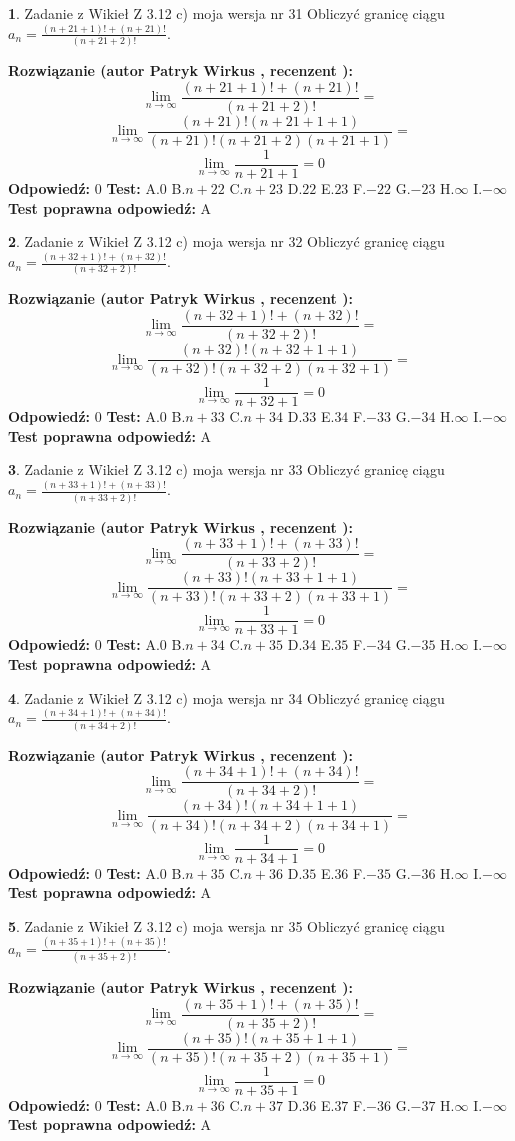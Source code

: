 \documentclass[12pt, a4paper]{article}
\theoremstyle{definition} %
\newtheorem{zad}{}
\newcommand{\zadStart}[1]{\begin{zad}#1\newline}
\newcommand{\zadStop}{\end{zad}}
\newcommand{\rozwStart}[2]{\noindent \textbf{Rozwiązanie (autor #1 , recenzent #2): }\newline}
\newcommand{\rozwStop}{\newline}
\newcommand{\odpStart}{\noindent \textbf{Odpowiedź:}\newline}
\newcommand{\odpStop}{\newline}
\newcommand{\testStart}{\noindent \textbf{Test:}\newline}
\newcommand{\testStop}{\newline}
\newcommand{\kluczStart}{\noindent \textbf{Test poprawna odpowiedź:}\newline}
\newcommand{\kluczStop}{\newline}
\begin{document}
\zadStart{Zadanie z Wikieł Z 3.12 c) moja wersja nr 31}
Obliczyć granicę ciągu $a_{n}=\frac{(n+21+1)!+(n+21)!}{(n+21+2)!}$.
\zadStop
\rozwStart{Patryk Wirkus}{}
$$\lim\limits_{n\to\infty}\frac{(n+21+1)!+(n+21)!}{(n+21+2)!}=$$
$$\lim\limits_{n\to\infty}\frac{(n+21)!(n+21+1+1)}{(n+21)!(n+21+2)(n+21+1)}=$$
$$\lim\limits_{n\to\infty}\frac{1}{n+21+1}= 0$$
\rozwStop
\odpStart
$0$
\odpStop
\testStart
A.$0$
B.$n+22$
C.$n+23$
D.$22$
E.$23$
F.$-22$
G.$-23$
H.$\infty$
I.$-\infty$
\testStop
\kluczStart
A
\kluczStop



\zadStart{Zadanie z Wikieł Z 3.12 c) moja wersja nr 32}
Obliczyć granicę ciągu $a_{n}=\frac{(n+32+1)!+(n+32)!}{(n+32+2)!}$.
\zadStop
\rozwStart{Patryk Wirkus}{}
$$\lim\limits_{n\to\infty}\frac{(n+32+1)!+(n+32)!}{(n+32+2)!}=$$
$$\lim\limits_{n\to\infty}\frac{(n+32)!(n+32+1+1)}{(n+32)!(n+32+2)(n+32+1)}=$$
$$\lim\limits_{n\to\infty}\frac{1}{n+32+1}= 0$$
\rozwStop
\odpStart
$0$
\odpStop
\testStart
A.$0$
B.$n+33$
C.$n+34$
D.$33$
E.$34$
F.$-33$
G.$-34$
H.$\infty$
I.$-\infty$
\testStop
\kluczStart
A
\kluczStop



\zadStart{Zadanie z Wikieł Z 3.12 c) moja wersja nr 33}
Obliczyć granicę ciągu $a_{n}=\frac{(n+33+1)!+(n+33)!}{(n+33+2)!}$.
\zadStop
\rozwStart{Patryk Wirkus}{}
$$\lim\limits_{n\to\infty}\frac{(n+33+1)!+(n+33)!}{(n+33+2)!}=$$
$$\lim\limits_{n\to\infty}\frac{(n+33)!(n+33+1+1)}{(n+33)!(n+33+2)(n+33+1)}=$$
$$\lim\limits_{n\to\infty}\frac{1}{n+33+1}= 0$$
\rozwStop
\odpStart
$0$
\odpStop
\testStart
A.$0$
B.$n+34$
C.$n+35$
D.$34$
E.$35$
F.$-34$
G.$-35$
H.$\infty$
I.$-\infty$
\testStop
\kluczStart
A
\kluczStop



\zadStart{Zadanie z Wikieł Z 3.12 c) moja wersja nr 34}
Obliczyć granicę ciągu $a_{n}=\frac{(n+34+1)!+(n+34)!}{(n+34+2)!}$.
\zadStop
\rozwStart{Patryk Wirkus}{}
$$\lim\limits_{n\to\infty}\frac{(n+34+1)!+(n+34)!}{(n+34+2)!}=$$
$$\lim\limits_{n\to\infty}\frac{(n+34)!(n+34+1+1)}{(n+34)!(n+34+2)(n+34+1)}=$$
$$\lim\limits_{n\to\infty}\frac{1}{n+34+1}= 0$$
\rozwStop
\odpStart
$0$
\odpStop
\testStart
A.$0$
B.$n+35$
C.$n+36$
D.$35$
E.$36$
F.$-35$
G.$-36$
H.$\infty$
I.$-\infty$
\testStop
\kluczStart
A
\kluczStop



\zadStart{Zadanie z Wikieł Z 3.12 c) moja wersja nr 35}
Obliczyć granicę ciągu $a_{n}=\frac{(n+35+1)!+(n+35)!}{(n+35+2)!}$.
\zadStop
\rozwStart{Patryk Wirkus}{}
$$\lim\limits_{n\to\infty}\frac{(n+35+1)!+(n+35)!}{(n+35+2)!}=$$
$$\lim\limits_{n\to\infty}\frac{(n+35)!(n+35+1+1)}{(n+35)!(n+35+2)(n+35+1)}=$$
$$\lim\limits_{n\to\infty}\frac{1}{n+35+1}= 0$$
\rozwStop
\odpStart
$0$
\odpStop
\testStart
A.$0$
B.$n+36$
C.$n+37$
D.$36$
E.$37$
F.$-36$
G.$-37$
H.$\infty$
I.$-\infty$
\testStop
\kluczStart
A
\kluczStop
\end{document}
